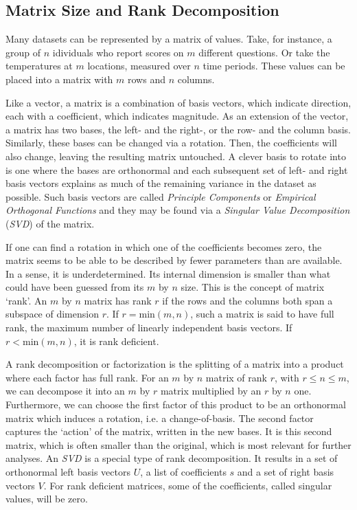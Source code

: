 \documentclass{acm_proc_article-sp}
\begin{document}
\subsection{Matrix Size and Rank Decomposition}
\label{sec:Introduction Matrix Size and Rank Decomposition}

Many datasets can be represented by a matrix of values. Take, for instance, a group of $n$ idividuals who report scores on $m$ different questions. Or take the temperatures at $m$ locations, measured over $n$ time periods. These values can be placed into a matrix with $m$ rows and $n$ columns.

Like a vector, a matrix is a combination of basis vectors, which indicate direction, each with a coefficient, which indicates magnitude. As an extension of the vector, a matrix has two bases, the left- and the right-, or the row- and the column basis. Similarly, these bases can be changed via a rotation. Then, the coefficients will also change, leaving the resulting matrix untouched. A clever basis to rotate into is one where the bases are orthonormal and each subsequent set of left- and right basis vectors explains as much of the remaining variance in the dataset as possible. Such basis vectors are called \textit{Principle Components} or \textit{Empirical Orthogonal Functions} and they may be found via a \textit{Singular Value Decomposition} (\textit{SVD}) of the matrix.

If one can find a rotation in which one of the coefficients becomes zero, the matrix seems to be able to be described by fewer parameters than are available. In a sense, it is underdetermined. Its internal dimension is smaller than what could have been guessed from its $m$ by $n$ size. This is the concept of matrix `rank'. An $m$ by $n$ matrix has rank $r$ if the rows and the columns both span a subspace of dimension $r$. If $r = \text{min}(m, n)$, such a matrix is said to have full rank, the maximum number of linearly independent basis vectors. If $r < \text{min}(m, n)$, it is rank deficient.

A rank decomposition or factorization is the splitting of a matrix into a product where each factor has full rank. For an $m$ by $n$ matrix of rank $r$, with $r \leq n \leq m$, we can decompose it into an $m$ by $r$ matrix multiplied by an $r$ by $n$ one. Furthermore, we can choose the first factor of this product to be an orthonormal matrix which induces a rotation, i.e. a change-of-basis. The second factor captures the `action' of the matrix, written in the new bases. It is this second matrix, which is often smaller than the original, which is most relevant for further analyses. An \textit{SVD} is a special type of rank decomposition. It results in a set of orthonormal left basis vectors $U$, a list of coefficients $s$ and a set of right basis vectors $V$. For rank deficient matrices, some of the coefficients, called singular values, will be zero.
\end{document}
